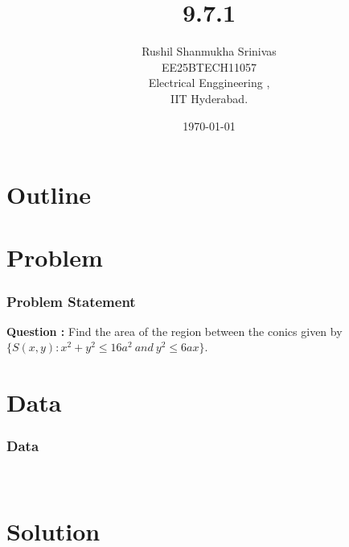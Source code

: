 \documentclass{beamer}
\title{9.7.1}
\author{Rushil Shanmukha Srinivas \\EE25BTECH11057 \\ Electrical Enggineering ,\\IIT Hyderabad.}
\date{\today}
\theoremstyle{remark}
\numberwithin{equation}{section}
\begin{document}
 

\begin{frame}
\titlepage
\end{frame}

\section*{Outline}
\begin{frame}
\tableofcontents
\end{frame}
\section{Problem}
\begin{frame}
\frametitle{Problem Statement}
\textbf{Question :} Find the area of the region between the conics given by $\{S(x,y) :
 x^2 + y^2 \leq 16a^2 \ and \ y^2 \leq 6ax 
\}$.
\end{frame}
\section{Data}
\begin{frame}
\frametitle{Data}
\\ \begin{table}[h!]    
  \centering
  
  \caption{Parabola and Circle}
\end{table}
\end{frame}
\section{Solution}
\end{document}
